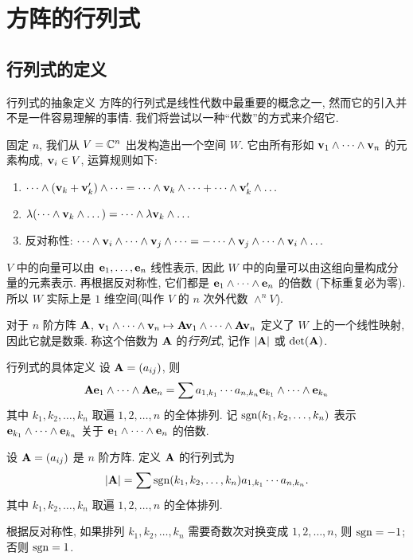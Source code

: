 \section{方阵的行列式}

\subsection{行列式的定义}

\begin{frame}{行列式的抽象定义\noexer}
	\onslide<+->
	方阵的行列式是线性代数中最重要的概念之一, 然而它的引入并不是一件容易理解的事情.
	\onslide<+->
	我们将尝试以一种``代数''的方式来介绍它.

	\onslide<+->
	固定 $n$, 我们从 $V={\mathbb{C}}^n$ 出发构造出一个空间 $W$.
	\onslide<+->
	它由所有形如 ${\mathbf{v}}_1\wedge \cdots\wedge {\mathbf{v}}_n$ 的元素构成, ${\mathbf{v}}_i\in V$, 运算规则如下:
	\begin{enumerate}
		\item $\dots\wedge({\mathbf{v}}_k+{\mathbf{v}}_k')\wedge \dots=\dots\wedge {\mathbf{v}}_k\wedge \dots+\dots\wedge {\mathbf{v}}_k'\wedge \dots$
		\item $\lambda(\dots\wedge {\mathbf{v}}_k\wedge \dots)=\dots\wedge \lambda{\mathbf{v}}_k\wedge \dots$
		\item 反对称性: $\dots\wedge {\mathbf{v}}_i\wedge \dots\wedge {\mathbf{v}}_j\wedge \dots=-\dots\wedge {\mathbf{v}}_j\wedge \dots\wedge {\mathbf{v}}_i\wedge \dots$
	\end{enumerate}

	\onslide<+->
	$V$ 中的向量可以由 ${\mathbf{e}}_1,\dots,{\mathbf{e}}_n$ 线性表示, 因此 $W$ 中的向量可以由这组向量构成分量的元素表示.
	\onslide<+->
	再根据反对称性, 它们都是 ${\mathbf{e}}_1\wedge \dots\wedge {\mathbf{e}}_n$ 的倍数 (下标重复必为零).
	\onslide<+->
	所以 $W$ 实际上是 $1$ 维空间(叫作 $V$ 的 $n$ 次外代数 $\wedge^n V$).

	\onslide<+->
	对于 $n$ 阶方阵 ${\mathbf{A}}$, ${\mathbf{v}}_1\wedge\dots\wedge {\mathbf{v}}_n\mapsto {\mathbf{A}}{\mathbf{v}}_1\wedge \dots\wedge {\mathbf{A}}{\mathbf{v}}_n$ 定义了 $W$ 上的一个线性映射, 因此它就是数乘.
	\onslide<+->
	称这个倍数为 ${\mathbf{A}}$ 的\emph{行列式}, 记作 $|{\mathbf{A}}|$ 或 $\det({\mathbf{A}})$.
\end{frame}


\begin{frame}{行列式的具体定义\noexer}
	\onslide<+->
	设 ${\mathbf{A}}=(a_{ij})$, 则
	\[{\mathbf{A}}{\mathbf{e}}_1\wedge \dots\wedge {\mathbf{A}}{\mathbf{e}}_n=\sum a_{1,k_1}\cdots a_{n,k_n} {\mathbf{e}}_{k_1}\wedge \dots\wedge {\mathbf{e}}_{k_n}\]
	其中 $k_1,k_2,\dots,k_n$ 取遍 $1,2,\dots,n$ 的全体排列.
	\onslide<+->
	记 $\operatorname{sgn}(k_1,k_2,\dots,k_n)$ 表示 ${\mathbf{e}}_{k_1}\wedge \dots\wedge {\mathbf{e}}_{k_n}$ 关于 ${\mathbf{e}}_1\wedge \dots\wedge {\mathbf{e}}_n$ 的倍数.
	\onslide<+->
	\begin{definition}
		设 ${\mathbf{A}}=(a_{ij})$ 是 $n$ 阶方阵.
		定义 ${\mathbf{A}}$ 的行列式为
		\[|{\mathbf{A}}|=\sum \operatorname{sgn}(k_1,k_2,\dots,k_n)a_{1,k_1}\cdots a_{n,k_n}.\]
		其中 $k_1,k_2,\dots,k_n$ 取遍 $1,2,\dots,n$ 的全体排列.
	\end{definition}
	\onslide<+->
	根据反对称性, 如果排列 $k_1,k_2,\dots,k_n$ 需要奇数次对换变成 $1,2,\dots,n$, 则 $\operatorname{sgn}=-1$; 否则 $\operatorname{sgn}=1$.
\end{frame}


